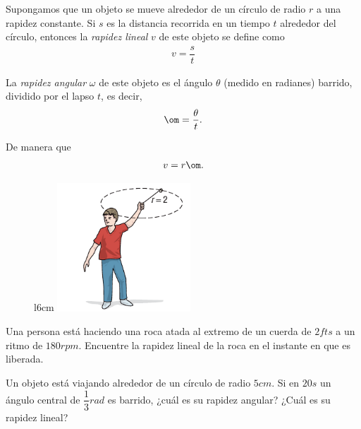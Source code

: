 {}
	Supongamos que un objeto se mueve alrededor de un círculo de radio $r$ a una rapidez constante. Si $s$ es la distancia recorrida en un tiempo $t$ alrededor del círculo, entonces la \emph{rapidez lineal} $v$ de este objeto se define como
	\begin{align}
		\label{sull6109}
		v=\dfrac{s}{t}
	\end{align}

{}
	La \emph{rapidez angular} $\omega$ de este objeto es el ángulo $\theta$ (medido en radianes) barrido, dividido por el lapso $t$, es decir, 
	\begin{align}
		\label{sull6110}
		\om=\dfrac{\theta}{t}.
	\end{align}
	
	De manera que 
	\begin{align}
		\label{sull6111}
		v = r\om.
	\end{align}

{}
	\begin{figure}{l}{6cm}
		\centering
		\includegraphics[width=5cm,keepaspectratio=true]{./trig/sull6117.png}
		\label{fig:6117}
	\end{figure}
	\begin{problema}
		\label{exmp:6108}
		Una persona está haciendo una roca atada al extremo de un cuerda de $2fts$ a un ritmo de $180rpm$. Encuentre la rapidez lineal de la roca en el instante en que es liberada.
	\end{problema}
	

{}
	\begin{problema}
		\label{exe:sull6197}
		Un objeto está viajando alrededor de un círculo de radio $5cm$. Si en $20s$ un ángulo central de $\dfrac{1}{3}rad$ es barrido, ¿cuál es su rapidez angular? ¿Cuál es su rapidez lineal?
	\end{problema}
	


